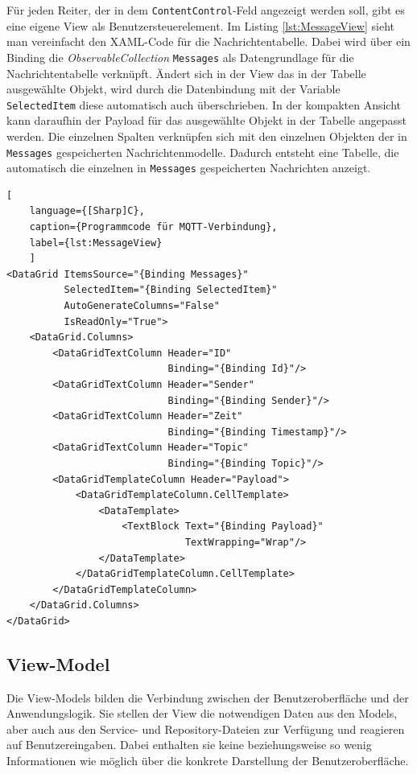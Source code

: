 Für jeden Reiter, der in dem \lstinline|ContentControl|-Feld angezeigt werden soll, gibt es eine eigene View als Benutzersteuerelement. Im Listing \ref{lst:MessageView} sieht man vereinfacht den XAML-Code für die Nachrichtentabelle. Dabei wird über ein Binding die \textit{ObservableCollection} \lstinline|Messages| als Datengrundlage für die Nachrichtentabelle verknüpft.
Ändert sich in der View das in der Tabelle ausgewählte Objekt, wird durch die Datenbindung mit der Variable \lstinline|SelectedItem| diese automatisch auch überschrieben. In der kompakten Ansicht kann daraufhin der Payload für das ausgewählte Objekt in der Tabelle angepasst werden. Die einzelnen Spalten verknüpfen sich mit den einzelnen Objekten der in \lstinline|Messages| gespeicherten Nachrichtenmodelle.
Dadurch entsteht eine Tabelle, die automatisch die einzelnen in \lstinline|Messages| gespeicherten Nachrichten anzeigt.
\begin{lstlisting}[
    language={[Sharp]C},
    caption={Programmcode für MQTT-Verbindung},
    label={lst:MessageView}
    ]
<DataGrid ItemsSource="{Binding Messages}"
          SelectedItem="{Binding SelectedItem}"
          AutoGenerateColumns="False"
          IsReadOnly="True">
    <DataGrid.Columns>
        <DataGridTextColumn Header="ID"
                            Binding="{Binding Id}"/>
        <DataGridTextColumn Header="Sender"
                            Binding="{Binding Sender}"/>
        <DataGridTextColumn Header="Zeit"
                            Binding="{Binding Timestamp}"/>
        <DataGridTextColumn Header="Topic"
                            Binding="{Binding Topic}"/>
        <DataGridTemplateColumn Header="Payload">
            <DataGridTemplateColumn.CellTemplate>
                <DataTemplate>
                    <TextBlock Text="{Binding Payload}"
                               TextWrapping="Wrap"/>
                </DataTemplate>
            </DataGridTemplateColumn.CellTemplate>
        </DataGridTemplateColumn>
    </DataGrid.Columns>
</DataGrid>
\end{lstlisting}

\subsection{View-Model}
Die View-Models bilden die Verbindung zwischen der Benutzeroberfläche und der Anwendungslogik. Sie stellen der View die notwendigen Daten aus den Models, aber auch aus den Service- und Repository-Dateien zur Verfügung und reagieren auf Benutzereingaben. Dabei enthalten sie keine beziehungsweise so wenig  Informationen  wie möglich über die konkrete Darstellung der Benutzeroberfläche.

